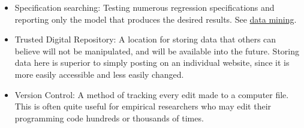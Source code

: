 \documentclass[12pt] {article}
\begin{document}
\begin{itemize}
\item Specification searching: Testing numerous regression specifications and reporting only the model that produces the desired results. See \hyperref[def-mining]{data mining}. 
\item
Trusted Digital Repository: A location for storing data that others can believe will not be manipulated, and will be available into the future. Storing data here is superior to simply posting on an individual website, since it is more easily accessible and less easily changed.  
\item
Version Control: A method of tracking every edit made to a computer file. This is often quite useful for empirical researchers who may edit their programming code hundreds or thousands of times.
\end{itemize}
\newpage
\singlespacing


\end{document}
